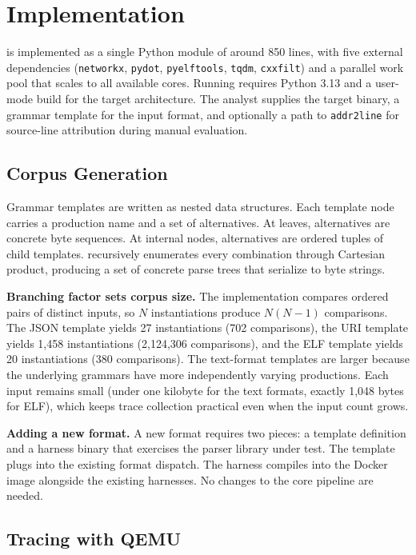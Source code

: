 \section{Implementation}\label{sec:implementation}

\toolname is implemented as a single Python module of around 850 lines, with five external dependencies (\texttt{networkx}, \texttt{pydot}, \texttt{pyelftools}, \texttt{tqdm}, \texttt{cxxfilt}) and a parallel work pool that scales to all available cores.
Running \toolname requires Python 3.13 and a \QEMU user-mode build for the target architecture.
The analyst supplies the target binary, a grammar template for the input format, and optionally a path to \texttt{addr2line} for source-line attribution during manual evaluation.

\subsection{Corpus Generation}\label{sec:impl:corpus}

Grammar templates are written as nested data structures.
Each template node carries a production name and a set of alternatives.
At leaves, alternatives are concrete byte sequences.
At internal nodes, alternatives are ordered tuples of child templates.
\toolname recursively enumerates every combination through Cartesian product, producing a set of concrete parse trees that serialize to byte strings.

\textbf{Branching factor sets corpus size.}
The implementation compares ordered pairs of distinct inputs, so $N$ instantiations produce $N(N-1)$ comparisons.
The JSON template yields 27 instantiations (702 comparisons), the URI template yields 1{,}458 instantiations (2{,}124{,}306 comparisons), and the ELF template yields 20 instantiations (380 comparisons).
The text-format templates are larger because the underlying grammars have more independently varying productions.
Each input remains small (under one kilobyte for the text formats, exactly 1{,}048 bytes for ELF), which keeps trace collection practical even when the input count grows.

\textbf{Adding a new format.}
A new format requires two pieces: a template definition and a harness binary that exercises the parser library under test.
The template plugs into the existing format dispatch.
The harness compiles into the Docker image alongside the existing harnesses.
No changes to the core pipeline are needed.

\subsection{Tracing with QEMU}\label{sec:impl:qemu}

